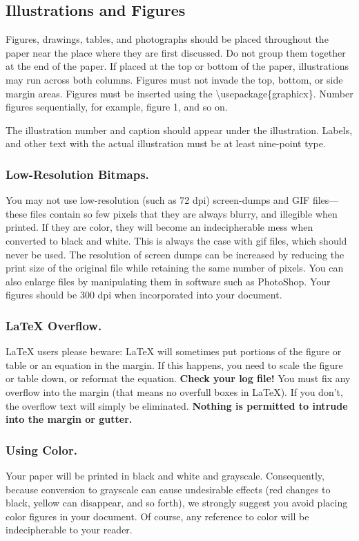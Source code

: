 \documentclass[letterpaper]{article}
\begin{document}
\subsection{Illustrations and Figures}
Figures, drawings, tables, and photographs should be placed throughout the paper near the place where they are first discussed. Do not group them together at the end of the paper. If placed at the top or bottom of the paper, illustrations may run across both columns. Figures must not invade the top, bottom, or side margin areas. Figures must be inserted using the \textbackslash usepackage\{graphicx\}. Number figures sequentially, for example, figure 1, and so on. 

The illustration number and caption should appear under the illustration. Labels, and other text with the actual illustration must be at least nine-point type. 

\subsubsection{Low-Resolution Bitmaps.}
You may not use low-resolution (such as 72 dpi) screen-dumps and GIF files---these files contain so few pixels that they are always blurry, and illegible when printed. If they are color, they will become an indecipherable mess when converted to black and white. This is always the case with gif files, which should never be used. The resolution of screen dumps can be increased by reducing the print size of the original file while retaining the same number of pixels. You can also enlarge files by manipulating them in software such as PhotoShop. Your figures should be 300 dpi when incorporated into your document.

\subsubsection{\LaTeX{} Overflow.}
\LaTeX{} users please beware: \LaTeX{} will sometimes put portions of the figure or table or an equation in the margin. If this happens, you need to scale the figure or table down, or reformat the equation.{ \bf Check your log file!} You must fix any overflow into the margin (that means no overfull boxes in \LaTeX{}). If you don't, the overflow text will simply be eliminated. \textbf{Nothing is permitted to intrude into the margin or gutter.}

\subsubsection{Using Color.}
Your paper will be printed in black and white and grayscale. Consequently, because conversion to grayscale can cause undesirable effects (red changes to black, yellow can disappear, and so forth), we strongly suggest you avoid placing color figures in your document. Of course, any reference to color will be indecipherable to your reader. 
\end{document}
